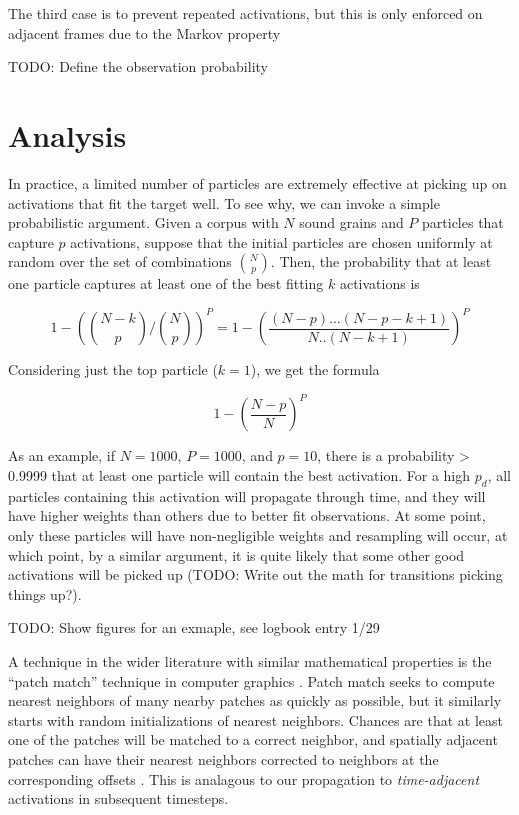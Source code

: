 \documentclass[letterpaper, 12pt]{article}
\begin{document}
    
        The third case is to prevent repeated activations, but this is only enforced on adjacent frames due to the Markov property

		TODO: Define the observation probability


\section{Analysis}

In practice, a limited number of particles are extremely effective at picking up on activations that fit the target well.  To see why, we can invoke a simple probabilistic argument.  Given a corpus with $N$ sound grains and $P$ particles that capture $p$ activations, suppose that the initial particles are chosen uniformly at random over the set of combinations $\binom{N}{p}$.  Then, the probability that at least one particle captures at least one of the best fitting $k$ activations is  

\[ 1 - \left(\binom{N-k}{p} / \binom{N}{p}\right)^P = 1 - \left( \frac{(N-p)...(N-p-k+1)}{N..(N-k+1)}\right) ^P \]

Considering just the top particle ($k=1$), we get the formula

\[ 1 - \left( \frac{N-p}{N} \right)^P \]

As an example, if $N = 1000$, $P = 1000$, and $p=10$, there is a probability > 0.9999 that at least one particle will contain the best activation.  For a high $p_d$, all particles containing this activation will propagate through time, and they will have higher weights than others due to better fit observations.  At some point, only these particles will have non-negligible weights and resampling will occur, at which point, by a similar argument, it is quite likely that some other good activations will be picked up (TODO: Write out the math for transitions picking things up?).

TODO: Show figures for an exmaple, see logbook entry 1/29

A technique in the wider literature with similar mathematical properties is the ``patch match'' technique in computer graphics \cite{Barnes:2009:PAR, Barnes:2010:TGP}.  Patch match seeks to compute nearest neighbors of many nearby patches as quickly as possible, but it similarly starts with random initializations of nearest neighbors.  Chances are that at least one of the patches will be matched to a correct neighbor, and spatially adjacent patches can have their nearest neighbors corrected to neighbors at the corresponding offsets \cite{Barnes:2009:PAR}.  This is analagous to our propagation to {\em time-adjacent} activations in subsequent timesteps.



\end{document}
